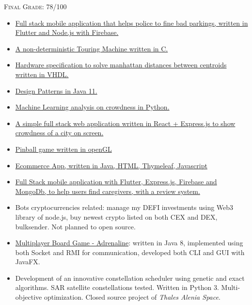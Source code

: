 \documentclass[10pt,a4paper]{altacv}
\begin{document}
\textsc{Final Grade}: 78/100

 \divider


\begin{itemize}
\item \href{https://github.com/fedy97/SafeStreets-Frontend-Flutter}{Full stack mobile application that helps police to fine bad parkings, written in Flutter and Node.js with Firebase.}
\item \href{https://github.com/fedy97/Progetto-Api-2018-Polimi}{A non-deterministic Touring Machine written in C.}
\item \href{https://github.com/fedy97/Progetto-Reti-Logiche-2018-Polimi}{Hardware specification to solve manhattan distances between centroids written in VHDL.}
\item \href{https://github.com/fedy97/Design-Patterns}{Design Patterns in Java 11.}
\item \href{https://github.com/fedy97/digital-innovation-lab-2020}{Machine Learning analysis on crowdness in Python.}
\item \href{https://github.com/fedy97/digital-innovation-lab-2020}{A simple full stack web application written in React + Express.js to show crowdness of a city on screen.}
\item \href{https://github.com/fedy97/computerGraphics}{Pinball game written in openGL}
\item \href{https://github.com/fedy97/TIW_HTML-2020-2021}{Ecommerce App, written in Java, HTML, Thymeleaf, Javascript}
\item \href{https://github.com/fedy97/Baddy-full-stack-app}{Full Stack mobile application with Flutter, Express.js, Firebase and MongoDb, to help users find caregivers, with a review system.}
\item Bots cryptocurrencies related: manage my DEFI investments using Web3 library of node.js, buy newest crypto listed on both CEX and DEX, bulksender. Not planned to open source.
\item \href{https://github.com/fedy97/ing-sw-2019-morreale-marini-orlando}{Multiplayer Board Game - Adrenaline}: written in Java 8, implemented using both Socket and RMI for communication, developed both CLI and GUI with JavaFX.
\item Development of an innovative constellation scheduler using genetic and exact algorithms. SAR satellite constellations tested. Written in Python 3. Multi-objective optimization. Closed source project of \textit{Thales Alenia Space}.
\end{itemize}


\clearpage
\end{document}
